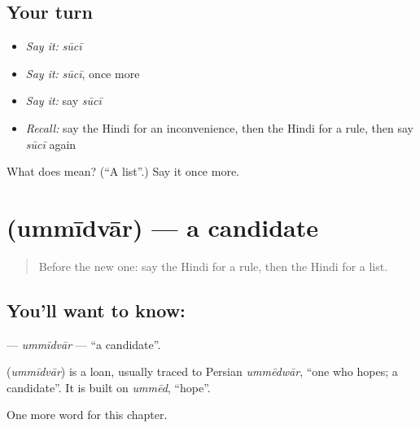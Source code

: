 \subsection*{Your turn}
\begin{itemize}
\raggedright
  \item \emph{Say it:} \emph{sūcī}
  \item \emph{Say it:} \emph{sūcī}, once more
  \item \emph{Say it:} say \emph{sūcī}
  \item \emph{Recall:} say the Hindi for an inconvenience, then the Hindi for a rule, then say \emph{sūcī} again
\end{itemize}

\begin{tcolorbox}[breakable,colback=teal!4,colframe=teal!35!black,title={Before you move on}]
What does  mean? (\textquotedblleft{}A list\textquotedblright{}.) Say it once more.
\end{tcolorbox}
\section[\texorpdfstring{\hi{उम्मीदवार} (ummīdvār)}{उम्मीदवार (ummīdvār)}]{ (ummīdvār) — a candidate}

\label{lesson:HI-C260-ummidvar}



\begin{quote}
Before the new one: say the Hindi for a rule, then the Hindi for a list.
\end{quote}

\subsection*{You'll want to know: }
\textbf{} — \emph{ummīdvār} — \textquotedblleft{}a candidate\textquotedblright{}.

\begin{cousinweb}
\textbf{} (\emph{ummīdvār}) is a loan, usually traced to Persian \emph{ummēdwār}, \textquotedblleft{}one who hopes; a candidate\textquotedblright{}. It is built on \emph{ummēd}, \textquotedblleft{}hope\textquotedblright{}.
\end{cousinweb}

\begin{grammarlens}[title={What you've built}]
One more word for this chapter.
\end{grammarlens}

